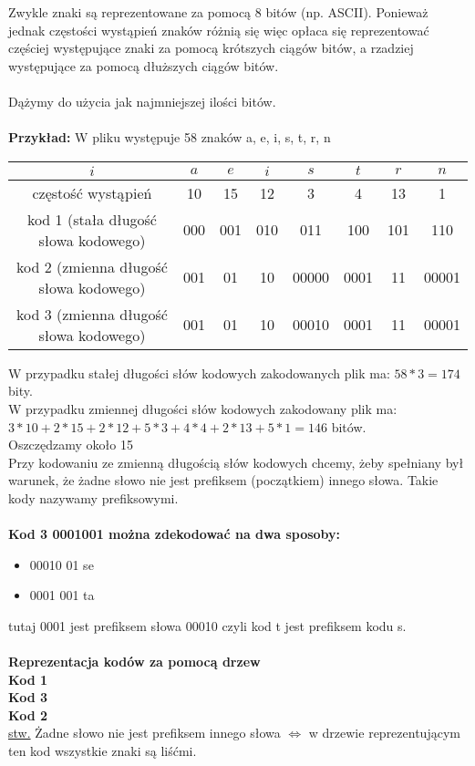 Zwykle znaki są reprezentowane za pomocą 8 bitów (np. ASCII). Ponieważ jednak częstości wystąpień znaków różnią się więc opłaca się reprezentować częściej występujące znaki za pomocą krótszych ciągów bitów, a rzadziej  występujące za pomocą dłuższych ciągów bitów.\\
\\
Dążymy do użycia jak najmniejszej ilości bitów.\\
\\
\textbf{Przykład:} W pliku występuje 58 znaków a, e, i, s, t, r, n\\
\begin{center}
\begin{tabular}{ c | c | c | c | c | c | c | c }
  $i$ & $a$	& $e$ & $i$ & $s$ & $t$ & $r$ & $n$ \\ \hline
  częstość wystąpień & 10 &  15  &  12	&  3  &  4  &  13 &  1 \\ \hline
  kod 1 (stała długość słowa kodowego) & 000 & 001 & 010 & 011 & 100 & 101 & 110 \\ \hline
  kod 2 (zmienna długość słowa kodowego) & 001 & 01 & 10 & 00000 & 0001 & 11 & 00001 \\ \hline
  kod 3 (zmienna długość słowa kodowego) & 001 & 01 & 10 & 00010 & 0001 & 11 & 00001 \\  
\end{tabular}
\end{center}

W przypadku stałej długości słów kodowych zakodowanych plik ma: $58*3=174$ bity.\\
W przypadku zmiennej długości słów kodowych zakodowany plik ma: $3*10+2*15+2*12+5*3+4*4+2*13+5*1 = 146$ bitów.\\
Oszczędzamy około 15%
\\
Przy kodowaniu ze zmienną długością słów kodowych chcemy, żeby spełniany był warunek, że żadne słowo nie jest prefiksem (początkiem) innego słowa. Takie kody nazywamy prefiksowymi.\\
\\
\textbf{Kod 3 0001001 można zdekodować na dwa sposoby:}
\begin{itemize}
	\item 00010 01 se
	\item 0001 001 ta 
\end{itemize}
tutaj 0001 jest prefiksem słowa 00010 czyli kod t jest prefiksem kodu s.\\
\\
\textbf{Reprezentacja kodów za pomocą drzew}\\
\textbf{Kod 1}\\
\textbf{Kod 3}\\
\textbf{Kod 2}\\
\underline{stw.} Żadne słowo nie jest prefiksem innego słowa $\Leftrightarrow$ w drzewie reprezentującym ten kod wszystkie znaki są liśćmi.